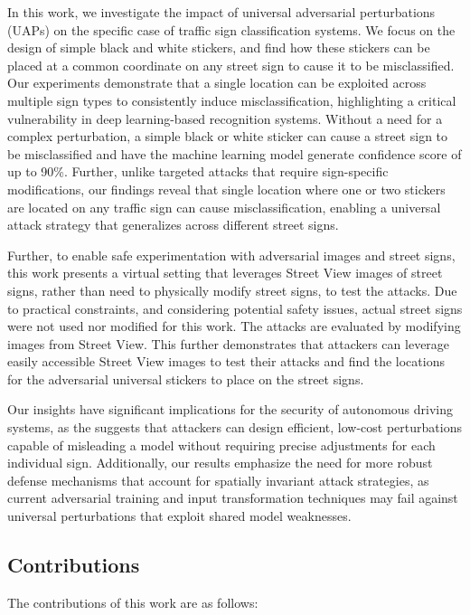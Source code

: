 In this work, we investigate the impact of universal adversarial perturbations (UAPs) on the specific case of traffic sign classification systems. We focus on the design of simple black and white stickers, and find how these stickers can be placed at a common coordinate on any street sign to cause it to be misclassified. Our experiments demonstrate that a single location can be exploited across multiple sign types to consistently induce misclassification, highlighting a critical vulnerability in deep learning-based recognition systems. Without a need for a complex perturbation, a simple black or white sticker can cause a street sign to be misclassified and have the machine learning model generate confidence score of up to 90\%. Further, unlike targeted attacks that require sign-specific modifications, our findings reveal that single location where one or two stickers are located on any traffic sign can cause misclassification, enabling a universal attack strategy that generalizes across different street signs.

Further, to enable safe experimentation with adversarial images and street signs, this work presents a virtual setting that leverages Street View images of street signs, rather than need to physically modify street signs, to test the attacks. Due to practical constraints, and considering potential safety issues, actual street signs were not used nor modified for this work. The attacks are evaluated by modifying images from Street View. This further demonstrates that attackers can leverage easily accessible Street View images to test their attacks and find the locations for the adversarial universal stickers to place on the street signs.

Our insights have significant implications for the security of autonomous driving systems, as the suggests that attackers can design efficient, low-cost perturbations capable of misleading a model without requiring precise adjustments for each individual sign. Additionally, our results emphasize the need for more robust defense mechanisms that account for spatially invariant attack strategies, as current adversarial training and input transformation techniques may fail against universal perturbations that exploit shared model weaknesses.


\subsection{Contributions}

The contributions of this work are as follows:

